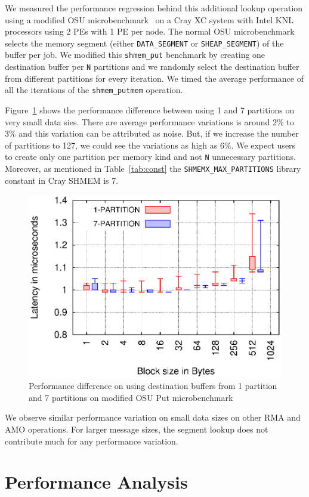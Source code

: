 We measured the performance regression behind this additional lookup
operation using a modified OSU microbenchmark~\cite{pgas-benchmarks}
on a Cray XC system with Intel KNL processors using 2 PEs with 1 PE per
node.
The normal OSU microbenchmark selects the memory segment (either
\texttt{DATA\_SEGMENT} or \texttt{SHEAP\_SEGMENT}) of the buffer
per job. We modified this \texttt{shmem\_put} benchmark by creating
one destination buffer per \texttt{N} partitions and we randomly select
the destination buffer from different partitions for every iteration.
We timed the average performance of all the iterations of the
\texttt{shmem\_putmem} operation.

Figure~\ref{graph:lookup} shows the
performance difference between using 1 and 7 partitions on very small
data sies. There are average performance variations is around 2\% to
3\% and this variation can be attributed as noise. But, if we increase
the number of partitions to 127, we could see the variations as high as
6\%. We expect users to create only one partition per memory kind
and not \texttt{N} unnecessary partitions. Moreover, as mentioned in
Table~\ref{tab:const} the \texttt{SHMEMX\_MAX\_PARTITIONS} library constant
in Cray SHMEM is 7.

\begin{figure}[t!]
    \centering
    \includegraphics[width=\linewidth]{graph/osu-put.eps}
    \caption{Performance difference on using destination buffers
    from 1 partition and 7 partitions
    on modified OSU Put microbenchmark}
    \label{graph:lookup}
    \vspace{-20pt}
\end{figure}

We observe similar performance variation on small data sizes on other
RMA and AMO operations. For larger message sizes, the segment lookup
does not contribute much for any performance variation.

\section{Performance Analysis}
\label{src:perf}